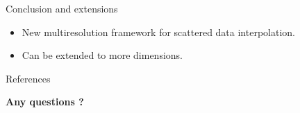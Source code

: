            \begin{frame}{Conclusion and extensions}
                \begin{itemize}
                    \item<1-> New multiresolution framework for scattered data interpolation.
                        \vspace{0.3cm}
                    \item<2-> Can be extended to more dimensions.
                \end{itemize}
                \vfill
            \end{frame}

            \begin{frame}{References}
                \small
                \raggedright
                \nocite{*}
                
                
                \vfill
                \begin{center}
                    \Large
                    \textcolor{titlecolor}{\textbf{Any questions ?}}
                \end{center} 
            \end{frame}

            
